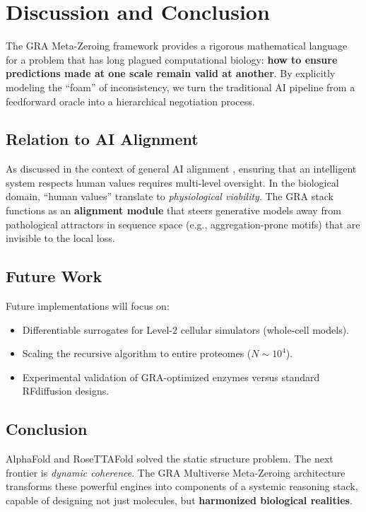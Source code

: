 \documentclass[11pt]{article}
\begin{document}
\section{Discussion and Conclusion}

The GRA Meta-Zeroing framework provides a rigorous mathematical language for a problem that has long plagued computational biology: \textbf{how to ensure predictions made at one scale remain valid at another}. By explicitly modeling the ``foam'' of inconsistency, we turn the traditional AI pipeline from a feedforward oracle into a hierarchical negotiation process.

\subsection{Relation to AI Alignment}
As discussed in the context of general AI alignment \cite{harvard_align_2026}, ensuring that an intelligent system respects human values requires multi-level oversight. In the biological domain, ``human values'' translate to \emph{physiological viability}. The GRA stack functions as an \textbf{alignment module} that steers generative models away from pathological attractors in sequence space (e.g., aggregation-prone motifs) that are invisible to the local loss.

\subsection{Future Work}
Future implementations will focus on:
\begin{itemize}
    \item Differentiable surrogates for Level-2 cellular simulators (whole-cell models).
    \item Scaling the recursive algorithm to entire proteomes (\(N \sim 10^4\)).
    \item Experimental validation of GRA-optimized enzymes versus standard RFdiffusion designs.
\end{itemize}

\subsection*{Conclusion}
AlphaFold and RoseTTAFold solved the static structure problem. The next frontier is \emph{dynamic coherence}. The GRA Multiverse Meta-Zeroing architecture transforms these powerful engines into components of a systemic reasoning stack, capable of designing not just molecules, but \textbf{harmonized biological realities}.
\end{document}
